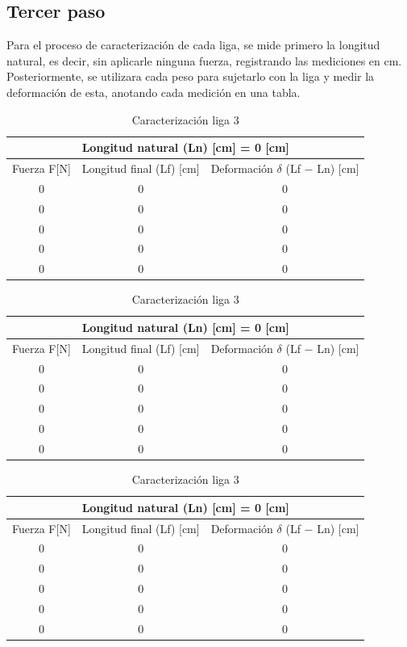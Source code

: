 \documentclass[12pt, titlepage]{report}
\begin{document}
    \subsection*{Tercer paso}
    Para el proceso de caracterización de cada liga, se mide primero la longitud natural, es decir, sin aplicarle ninguna fuerza, registrando las mediciones en cm. Posteriormente, se utilizara cada peso para sujetarlo con la liga y medir la deformación de esta, anotando cada medición en una tabla. 

    \begin{table}[ht]
        \centering
        \begin{tabular}{|c|c|c|}
            \hline
            \multicolumn{3}{|c|}{Longitud natural (Ln) [cm] = 0 [cm]} \\ \hline
            Fuerza F[N] & Longitud final (Lf) [cm] & Deformación $\delta$  (Lf $-$ Ln) [cm] \\ \hline
            0 & 0 & 0 \\ \hline
            0 & 0 & 0 \\ \hline
            0 & 0 & 0 \\ \hline
            0 & 0 & 0 \\ \hline
            0 & 0 & 0 \\ \hline
        \end{tabular}
        \caption{Caracterización liga 1}
        \vspace*{2cm}

        \begin{tabular}{|c|c|c|}
            \hline
            \multicolumn{3}{|c|}{Longitud natural (Ln) [cm] = 0 [cm]} \\ \hline
            Fuerza F[N] & Longitud final (Lf) [cm] & Deformación $\delta$  (Lf $-$ Ln) [cm] \\ \hline
            0 & 0 & 0 \\ \hline
            0 & 0 & 0 \\ \hline
            0 & 0 & 0 \\ \hline
            0 & 0 & 0 \\ \hline
            0 & 0 & 0 \\ \hline
        \end{tabular}
        \caption{Caracterización liga 2}
        \vspace*{2cm}

        \begin{tabular}{|c|c|c|}
            \hline
            \multicolumn{3}{|c|}{Longitud natural (Ln) [cm] = 0 [cm]} \\ \hline
            Fuerza F[N] & Longitud final (Lf) [cm] & Deformación $\delta$  (Lf $-$ Ln) [cm] \\ \hline
            0 & 0 & 0 \\ \hline
            0 & 0 & 0 \\ \hline
            0 & 0 & 0 \\ \hline
            0 & 0 & 0 \\ \hline
            0 & 0 & 0 \\ \hline
        \end{tabular}
        \caption{Caracterización liga 3}
    \end{table}
    \clearpage
\end{document}

